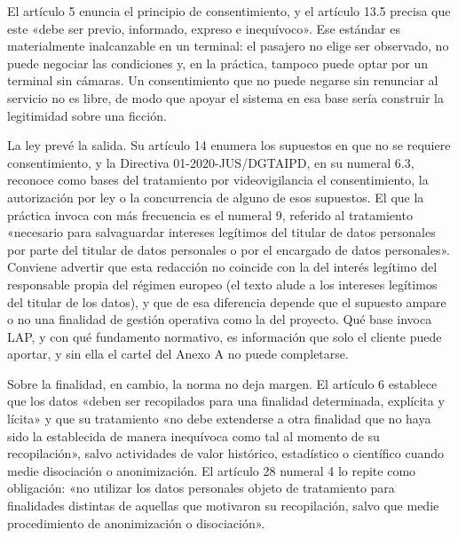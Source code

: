 El artículo 5 enuncia el principio de consentimiento, y el artículo 13.5
precisa que este «debe ser previo, informado, expreso e inequívoco». Ese
estándar es materialmente inalcanzable en un terminal: el pasajero no
elige ser observado, no puede negociar las condiciones y, en la
práctica, tampoco puede optar por un terminal sin cámaras. Un
consentimiento que no puede negarse sin renunciar al servicio no es
libre, de modo que apoyar el sistema en esa base sería construir la
legitimidad sobre una ficción.

La ley prevé la salida. Su artículo 14 enumera los supuestos en que no
se requiere consentimiento, y la Directiva 01-2020-JUS/DGTAIPD, en su
numeral 6.3, reconoce como bases del tratamiento por videovigilancia el
consentimiento, la autorización por ley o la concurrencia de alguno de
esos supuestos. El que la práctica invoca con más frecuencia es el
numeral 9, referido al tratamiento «necesario para salvaguardar
intereses legítimos del titular de datos personales por parte del
titular de datos personales o por el encargado de datos personales».
Conviene advertir que esta redacción no coincide con la del interés
legítimo del responsable propia del régimen europeo (el texto alude a
los intereses legítimos del titular de los datos), y que de esa
diferencia depende que el supuesto ampare o no una finalidad de gestión
operativa como la del proyecto. Qué base invoca LAP, y con qué
fundamento normativo, es información que solo el cliente puede aportar,
y sin ella el cartel del Anexo A no puede completarse.

Sobre la finalidad, en cambio, la norma no deja margen. El artículo 6
establece que los datos «deben ser recopilados para una finalidad
determinada, explícita y lícita» y que su tratamiento «no debe
extenderse a otra finalidad que no haya sido la establecida de manera
inequívoca como tal al momento de su recopilación», salvo actividades de
valor histórico, estadístico o científico cuando medie disociación o
anonimización. El artículo 28 numeral 4 lo repite como obligación: «no
utilizar los datos personales objeto de tratamiento para finalidades
distintas de aquellas que motivaron su recopilación, salvo que medie
procedimiento de anonimización o disociación».

